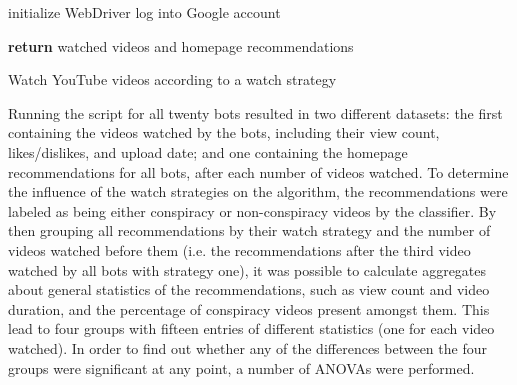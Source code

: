 \documentclass[../main.tex]{subfiles}
\begin{document}
\begin{algorithm}[H]
 
 \vspace{0.075in}
 initialize WebDriver\;
 log into Google account\;

 \vspace{0.05in}
 \textbf{return} watched videos and homepage recommendations\;
 \caption{Watch YouTube videos according to a watch strategy}
\end{algorithm}

\vspace{0.25in}

\noindent Running the script for all twenty bots resulted in two different datasets: the first containing
the videos watched by the bots, including their view count, likes/dislikes, and upload date; and one 
containing the homepage recommendations for all bots, after each number of videos watched.
To determine the influence of the watch strategies on the algorithm, the recommendations were labeled as 
being either conspiracy or non-conspiracy videos by the classifier. By then grouping all recommendations 
by their watch strategy and the number of videos watched before them (i.e. the recommendations after the 
third video watched by all bots with strategy one), it was possible to calculate aggregates about general
statistics of the recommendations, such as view count and video duration, and the percentage of 
conspiracy videos present amongst them. This lead to four groups with fifteen entries of different 
statistics (one for each video watched). In order to find out whether any of the differences between the 
four groups were significant at any point, a number of ANOVAs were performed. 
\end{document}
